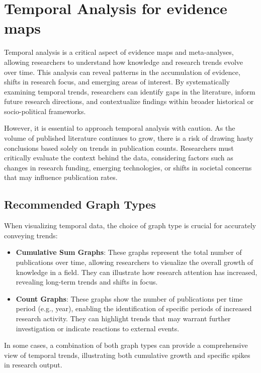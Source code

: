 \documentclass[
]{book}
\begin{document}
\chapter{Temporal Analysis for evidence maps}\label{temporal-analysis-for-evidence-maps}

Temporal analysis is a critical aspect of evidence maps and meta-analyses, allowing researchers to understand how knowledge and research trends evolve over time.
This analysis can reveal patterns in the accumulation of evidence, shifts in research focus, and emerging areas of interest.
By systematically examining temporal trends, researchers can identify gaps in the literature, inform future research directions, and contextualize findings within broader historical or socio-political frameworks.

However, it is essential to approach temporal analysis with caution.
As the volume of published literature continues to grow, there is a risk of drawing hasty conclusions based solely on trends in publication counts.
Researchers must critically evaluate the context behind the data, considering factors such as changes in research funding, emerging technologies, or shifts in societal concerns that may influence publication rates.

\section{Recommended Graph Types}\label{recommended-graph-types}

When visualizing temporal data, the choice of graph type is crucial for accurately conveying trends:

\begin{itemize}
\item
  \textbf{Cumulative Sum Graphs}: These graphs represent the total number of publications over time, allowing researchers to visualize the overall growth of knowledge in a field.
  They can illustrate how research attention has increased, revealing long-term trends and shifts in focus.
\item
  \textbf{Count Graphs}: These graphs show the number of publications per time period (e.g., year), enabling the identification of specific periods of increased research activity.
  They can highlight trends that may warrant further investigation or indicate reactions to external events.
\end{itemize}

In some cases, a combination of both graph types can provide a comprehensive view of temporal trends, illustrating both cumulative growth and specific spikes in research output.
\end{document}
